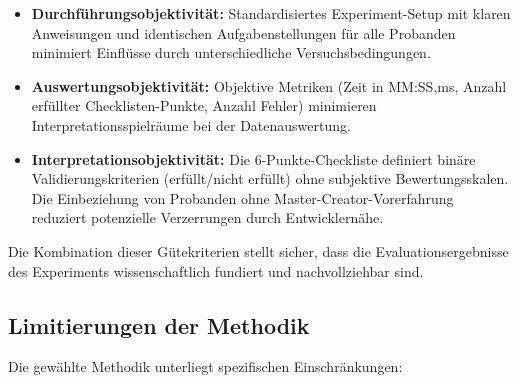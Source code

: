 \begin{itemize}
    \item \textbf{Durchführungsobjektivität:} Standardisiertes Experiment-Setup mit klaren Anweisungen und identischen Aufgabenstellungen für alle Probanden minimiert Einflüsse durch unterschiedliche Versuchsbedingungen.

    \item \textbf{Auswertungsobjektivität:} Objektive Metriken (Zeit in MM:SS,ms, Anzahl erfüllter Checklisten-Punkte, Anzahl Fehler) minimieren Interpretationsspielräume bei der Datenauswertung.

    \item \textbf{Interpretationsobjektivität:} Die 6-Punkte-Checkliste definiert binäre Validierungskriterien (erfüllt/nicht erfüllt) ohne subjektive Bewertungsskalen. Die Einbeziehung von Probanden ohne Master-Creator-Vorerfahrung reduziert potenzielle Verzerrungen durch Entwicklernähe.
\end{itemize}

\noindent Die Kombination dieser Gütekriterien stellt sicher, dass die Evaluationsergebnisse des Experiments wissenschaftlich fundiert und nachvollziehbar sind.


\subsection{Limitierungen der Methodik}
\label{subsec:LimitierungenMethodik}

Die gewählte Methodik unterliegt spezifischen Einschränkungen:

